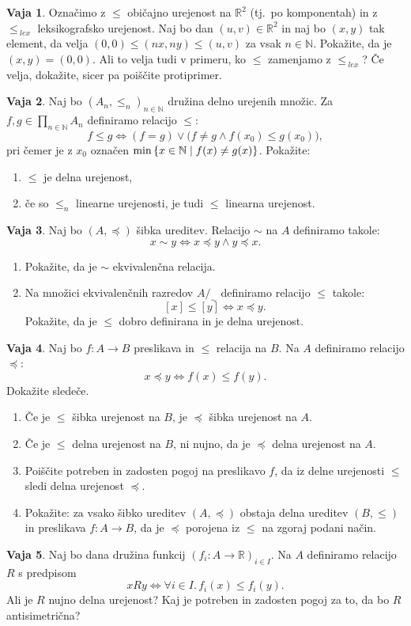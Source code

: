 \documentclass{article}
\newcommand{\all}[1]{\forall #1 .\,}
\newcommand{\NN}{\mathbb{N}}
\newcommand{\RR}{\mathbb{R}}
\theoremstyle{definition}
\newtheorem{vaja}{Vaja}
\begin{document}
\begin{vaja}
  Označimo z $\leq$ običajno urejenost na $\RR^2$ (tj.~po komponentah) in z $\leq_{\:lex}$ leksikografsko urejenost. Naj bo dan $(u,v) \in \RR^2$ in naj bo $(x,y)$ tak element, da velja $(0,0) \leq (nx,ny) \leq (u,v)$ za vsak $n \in \NN$. Pokažite, da je $(x,y) = (0,0)$. Ali to velja tudi v primeru, ko $\leq$ zamenjamo z $\leq_{\:lex}$? Če velja, dokažite, sicer pa poiščite protiprimer.
\end{vaja}

\begin{vaja}
  Naj bo $(A_n, \leq_n)_{n \in \NN}$ družina delno urejenih množic. Za $\displaystyle{f, g \in \prod_{n \in \NN} A_n}$ definiramo relacijo $\leq$:
  \[f \leq g \iff (f = g) \lor \big(f \neq g \land f(x_0) \leq g(x_0)\big),\]
  pri čemer je z $x_0$ označen $\min\set{x \in \NN}{f(x) \neq g(x)}$. Pokažite:
  \begin{enumerate}
    \item
      $\leq$ je delna urejenost,
    \item
      če so $\leq_n$ linearne urejenosti, je tudi $\leq$ linearna urejenost.
  \end{enumerate}
\end{vaja}

\begin{vaja}
  Naj bo $(A, \preceq)$ šibka ureditev. Relacijo $\sim$ na $A$ definiramo takole:
  \[x \sim y \iff x \preceq y \land y \preceq x.\]
  \begin{enumerate}
    \item
      Pokažite, da je $\sim$ ekvivalenčna relacija.
    \item
      Na množici ekvivalenčnih razredov $A/_\sim$ definiramo relacijo $\leq$ takole:
      \[[x] \leq [y] \iff x \preceq y.\]
      Pokažite, da je $\leq$ dobro definirana in je delna urejenost.
  \end{enumerate}
\end{vaja}

\begin{vaja}
  Naj bo $f\colon A \to B$ preslikava in $\leq$ relacija na $B$. Na $A$ definiramo relacijo $\preceq$:
  \[x \preceq y \iff f(x) \leq f(y).\]
  Dokažite sledeče.
  \begin{enumerate}
    \item
      Če je $\leq$ šibka urejenost na $B$, je $\preceq$ šibka urejenost na $A$.
    \item
      Če je $\leq$ delna urejenost na $B$, ni nujno, da je $\preceq$ delna urejenost na $A$.
    \item
      Poiščite potreben in zadosten pogoj na preslikavo $f$, da iz delne urejenosti $\leq$ sledi delna urejenost $\preceq$.
    \item
      Pokažite: za vsako šibko ureditev $(A, \preceq)$ obstaja delna ureditev $(B, \leq)$ in preslikava $f\colon A \to B$, da je $\preceq$ porojena iz $\leq$ na zgoraj podani način.
  \end{enumerate}
\end{vaja}

\begin{vaja}
  Naj bo dana družina funkcij $(f_i\colon A \to \RR)_{i \in I}$. Na $A$ definiramo relacijo $R$ s predpisom
  \[x R y \iff \all{i \in I}{f_i(x) \leq f_i(y)}.\]
  Ali je $R$ nujno delna urejenost? Kaj je potreben in zadosten pogoj za to, da bo $R$ antisimetrična?
\end{vaja}
\end{document}
